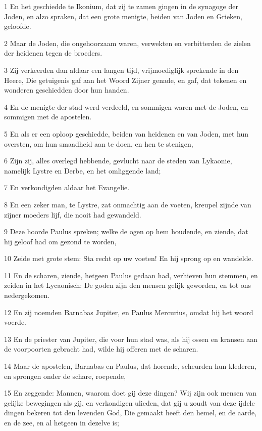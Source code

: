 \par 1 En het geschiedde te Ikonium, dat zij te zamen gingen in de synagoge der Joden, en alzo spraken, dat een grote menigte, beiden van Joden en Grieken, geloofde.
\par 2 Maar de Joden, die ongehoorzaam waren, verwekten en verbitterden de zielen der heidenen tegen de broeders.
\par 3 Zij verkeerden dan aldaar een langen tijd, vrijmoediglijk sprekende in den Heere, Die getuigenis gaf aan het Woord Zijner genade, en gaf, dat tekenen en wonderen geschiedden door hun handen.
\par 4 En de menigte der stad werd verdeeld, en sommigen waren met de Joden, en sommigen met de apostelen.
\par 5 En als er een oploop geschiedde, beiden van heidenen en van Joden, met hun oversten, om hun smaadheid aan te doen, en hen te stenigen,
\par 6 Zijn zij, alles overlegd hebbende, gevlucht naar de steden van Lykaonie, namelijk Lystre en Derbe, en het omliggende land;
\par 7 En verkondigden aldaar het Evangelie.
\par 8 En een zeker man, te Lystre, zat onmachtig aan de voeten, kreupel zijnde van zijner moeders lijf, die nooit had gewandeld.
\par 9 Deze hoorde Paulus spreken; welke de ogen op hem houdende, en ziende, dat hij geloof had om gezond te worden,
\par 10 Zeide met grote stem: Sta recht op uw voeten! En hij sprong op en wandelde.
\par 11 En de scharen, ziende, hetgeen Paulus gedaan had, verhieven hun stemmen, en zeiden in het Lycaonisch: De goden zijn den mensen gelijk geworden, en tot ons nedergekomen.
\par 12 En zij noemden Barnabas Jupiter, en Paulus Mercurius, omdat hij het woord voerde.
\par 13 En de priester van Jupiter, die voor hun stad was, als hij ossen en kransen aan de voorpoorten gebracht had, wilde hij offeren met de scharen.
\par 14 Maar de apostelen, Barnabas en Paulus, dat horende, scheurden hun klederen, en sprongen onder de schare, roepende,
\par 15 En zeggende: Mannen, waarom doet gij deze dingen? Wij zijn ook mensen van gelijke bewegingen als gij, en verkondigen ulieden, dat gij u zoudt van deze ijdele dingen bekeren tot den levenden God, Die gemaakt heeft den hemel, en de aarde, en de zee, en al hetgeen in dezelve is;
